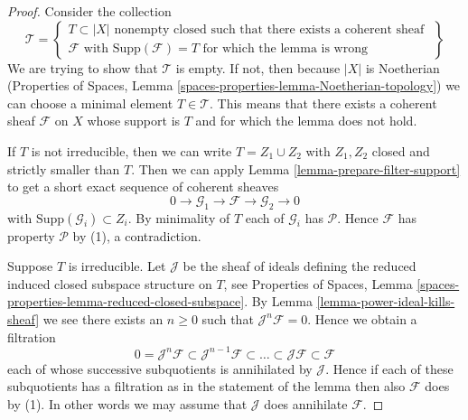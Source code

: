 \documentclass{stacks-project}
\theoremstyle{plain}
\theoremstyle{definition}
\theoremstyle{remark}
\numberwithin{equation}{subsection}
\begin{document}
\begin{proof}
Consider the collection
$$
\mathcal{T} =
\left\{
\begin{matrix}
T \subset |X|
\text{ nonempty closed such that there exists a coherent sheaf } \\
\mathcal{F}
\text{ with }
\text{Supp}(\mathcal{F}) = T
\text{ for which the lemma is wrong}
\end{matrix}
\right\}
$$
We are trying to show that $\mathcal{T}$ is empty. If not, then
because $|X|$ is Noetherian (Properties of Spaces, Lemma
\ref{spaces-properties-lemma-Noetherian-topology})
we can choose a minimal element $T \in \mathcal{T}$. This means that
there exists a coherent sheaf $\mathcal{F}$ on $X$ whose support is $T$
and for which the lemma does not hold.

\medskip\noindent
If $T$ is not irreducible, then we can write $T = Z_1 \cup Z_2$
with $Z_1, Z_2$ closed and strictly smaller than $T$.
Then we can apply Lemma \ref{lemma-prepare-filter-support}
to get a short exact sequence of coherent sheaves
$$
0 \to
\mathcal{G}_1 \to
\mathcal{F} \to
\mathcal{G}_2 \to 0
$$
with $\text{Supp}(\mathcal{G}_i) \subset Z_i$. By minimality of
$T$ each of $\mathcal{G}_i$ has $\mathcal{P}$. Hence $\mathcal{F}$
has property $\mathcal{P}$ by (1), a contradiction.

\medskip\noindent
Suppose $T$ is irreducible. Let $\mathcal{J}$ be the sheaf of ideals
defining the reduced induced closed subspace structure on $T$,
see Properties of Spaces, Lemma
\ref{spaces-properties-lemma-reduced-closed-subspace}.
By Lemma \ref{lemma-power-ideal-kills-sheaf} we see there exists
an $n \geq 0$ such that $\mathcal{J}^n\mathcal{F} = 0$. Hence we obtain
a filtration
$$
0 = \mathcal{J}^n\mathcal{F} \subset \mathcal{J}^{n - 1}\mathcal{F}
\subset \ldots \subset \mathcal{J}\mathcal{F} \subset \mathcal{F}
$$
each of whose successive subquotients is annihilated by $\mathcal{J}$.
Hence if each of these subquotients has a filtration as in the statement
of the lemma then also $\mathcal{F}$ does by (1). In other words we may
assume that $\mathcal{J}$ does annihilate $\mathcal{F}$.


\end{proof}
\end{document}
